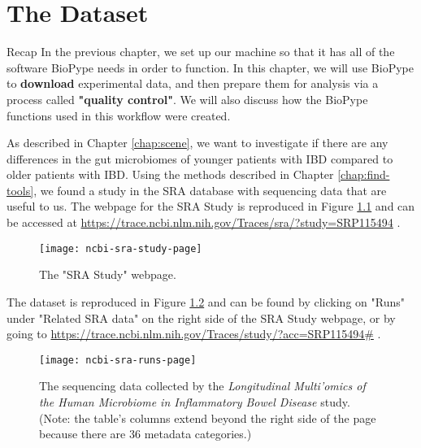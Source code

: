 \chapter{The Dataset}
    \begin{maxipage}
    \begin{bclogo}[couleur = vlightgray, logo = \bcinfo] {Recap}
    In the previous chapter, we set up our machine so that it has all of the software BioPype needs in order to function. \newline \newline In this chapter, we will use BioPype to \textbf{download} experimental data, and then prepare them for analysis via a process called \textbf{"quality control"}. We will also discuss how the BioPype functions used in this workflow were created.
    \end{bclogo}
    \end{maxipage}

As described in Chapter \ref{chap:scene}, we want to investigate if there are any differences in the gut microbiomes of younger patients with IBD compared to older patients with IBD. Using the methods described in Chapter \ref{chap:find-tools}, we found a study in the SRA database with sequencing data that are useful to us. The webpage for the SRA Study is reproduced in Figure \ref{fig:ncbi-sra-study-page} and can be accessed at
    \url{https://trace.ncbi.nlm.nih.gov/Traces/sra/?study=SRP115494} .
    
%
\begin{figure}[hbtp]
    \begin{maxipage}
    \centering
    \texttt{[image: ncbi-sra-study-page]}
    \caption{The "SRA Study" webpage.}
    \label{fig:ncbi-sra-study-page}
    \end{maxipage}
\end{figure}
%

The dataset is reproduced in Figure \ref{fig:ncbi-sra-runs-page} and can be found by clicking on "Runs" under "Related SRA data" on the right side of the SRA Study webpage, or by going to \url{https://trace.ncbi.nlm.nih.gov/Traces/study/?acc=SRP115494#} .

%
\begin{figure}[hbtp]
    \begin{maxipage}
    \centering
    \texttt{[image: ncbi-sra-runs-page]}
    \caption{The sequencing data collected by the \textit{Longitudinal Multi'omics of the Human Microbiome in Inflammatory Bowel Disease} study. (Note: the table's columns extend beyond the right side of the page because there are 36 metadata categories.)}
    \label{fig:ncbi-sra-runs-page}
    \end{maxipage}
\end{figure}
%
    
